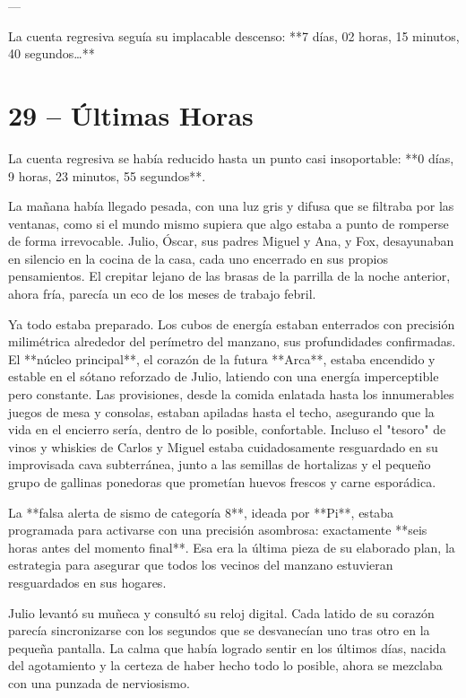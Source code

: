\documentclass[a4paper,12pt]{book}
\begin{document}
---

La cuenta regresiva seguía su implacable descenso: **7 días, 02 horas, 15 minutos, 40 segundos…**

\cleardoublepage %

\chapter*{29 – Últimas Horas}

La cuenta regresiva se había reducido hasta un punto casi insoportable: **0 días, 9 horas, 23 minutos, 55 segundos**.

La mañana había llegado pesada, con una luz gris y difusa que se filtraba por las ventanas, como si el mundo mismo supiera que algo estaba a punto de romperse de forma irrevocable. Julio, Óscar, sus padres Miguel y Ana, y Fox, desayunaban en silencio en la cocina de la casa, cada uno encerrado en sus propios pensamientos. El crepitar lejano de las brasas de la parrilla de la noche anterior, ahora fría, parecía un eco de los meses de trabajo febril.

Ya todo estaba preparado. Los cubos de energía estaban enterrados con precisión milimétrica alrededor del perímetro del manzano, sus profundidades confirmadas. El **núcleo principal**, el corazón de la futura **Arca**, estaba encendido y estable en el sótano reforzado de Julio, latiendo con una energía imperceptible pero constante. Las provisiones, desde la comida enlatada hasta los innumerables juegos de mesa y consolas, estaban apiladas hasta el techo, asegurando que la vida en el encierro sería, dentro de lo posible, confortable. Incluso el "tesoro" de vinos y whiskies de Carlos y Miguel estaba cuidadosamente resguardado en su improvisada cava subterránea, junto a las semillas de hortalizas y el pequeño grupo de gallinas ponedoras que prometían huevos frescos y carne esporádica.

La **falsa alerta de sismo de categoría 8**, ideada por **Pi**, estaba programada para activarse con una precisión asombrosa: exactamente **seis horas antes del momento final**. Esa era la última pieza de su elaborado plan, la estrategia para asegurar que todos los vecinos del manzano estuvieran resguardados en sus hogares.

Julio levantó su muñeca y consultó su reloj digital. Cada latido de su corazón parecía sincronizarse con los segundos que se desvanecían uno tras otro en la pequeña pantalla. La calma que había logrado sentir en los últimos días, nacida del agotamiento y la certeza de haber hecho todo lo posible, ahora se mezclaba con una punzada de nerviosismo.
\end{document}
